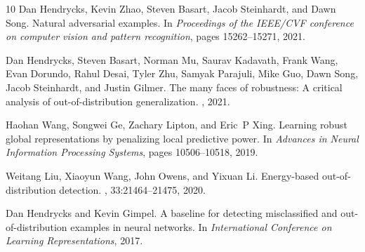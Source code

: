 \documentclass[conference]{IEEEtran}
\begin{document}
\begin{thebibliography}{10}
Dan Hendrycks, Kevin Zhao, Steven Basart, Jacob Steinhardt, and Dawn Song.
\newblock Natural adversarial examples.
\newblock In {\em Proceedings of the IEEE/CVF conference on computer vision and pattern recognition}, pages 15262--15271, 2021.

Dan Hendrycks, Steven Basart, Norman Mu, Saurav Kadavath, Frank Wang, Evan Dorundo, Rahul Desai, Tyler Zhu, Samyak Parajuli, Mike Guo, Dawn Song, Jacob Steinhardt, and Justin Gilmer.
\newblock The many faces of robustness: A critical analysis of out-of-distribution generalization.
, 2021.

Haohan Wang, Songwei Ge, Zachary Lipton, and Eric~P Xing.
\newblock Learning robust global representations by penalizing local predictive power.
\newblock In {\em Advances in Neural Information Processing Systems}, pages 10506--10518, 2019.

Weitang Liu, Xiaoyun Wang, John Owens, and Yixuan Li.
\newblock Energy-based out-of-distribution detection.
, 33:21464--21475, 2020.

Dan Hendrycks and Kevin Gimpel.
\newblock A baseline for detecting misclassified and out-of-distribution examples in neural networks.
\newblock In {\em International Conference on Learning Representations}, 2017.

\end{thebibliography}
 

\vspace{12pt}
\end{document}
